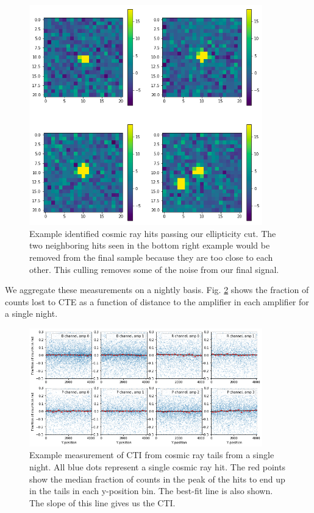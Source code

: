 \begin{figure}
    \centering
    \includegraphics[width=0.9\textwidth]{figures/chap2/example_hits.png}
    \caption{Example identified cosmic ray hits passing our ellipticity cut. The two neighboring hits seen in the bottom right example would be removed from the final sample because they are too close to each other. This culling removes some of the noise from our final signal.}
    \label{fig:example_hits}
\end{figure}

We aggregate these measurements on a nightly basis. Fig. \ref{fig:cte_single_night} shows the fraction of counts lost to CTE as a function of distance to the amplifier in each amplifier for a single night.

\begin{figure}
    \centering
    \includegraphics[width=0.9\textwidth]{figures/chap2/single_night_example_parallel.png}
    \caption{Example measurement of CTI from cosmic ray tails from a single night. All blue dots represent a single cosmic ray hit. The red points show the median fraction of counts in the peak of the hits to end up in the tails in each y-position bin. The best-fit line is also shown. The slope of this line gives us the CTI.}
    \label{fig:cte_single_night}
\end{figure}

